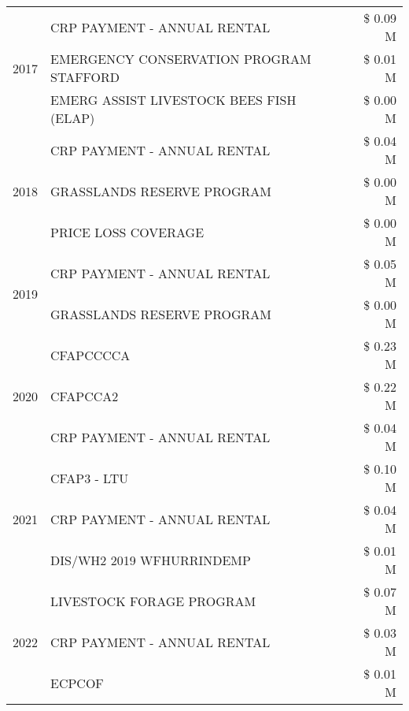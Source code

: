 \begin{tabular}{llr}
\cline{1-3}
\multirow[t]{3}{*}{2017} & CRP PAYMENT - ANNUAL RENTAL & \$ 0.09 M \\
 & EMERGENCY CONSERVATION PROGRAM STAFFORD & \$ 0.01 M \\
 & EMERG ASSIST LIVESTOCK BEES FISH (ELAP) & \$ 0.00 M \\
\cline{1-3}
\multirow[t]{3}{*}{2018} & CRP PAYMENT - ANNUAL RENTAL & \$ 0.04 M \\
 & GRASSLANDS RESERVE PROGRAM & \$ 0.00 M \\
 & PRICE LOSS COVERAGE & \$ 0.00 M \\
\cline{1-3}
\multirow[t]{2}{*}{2019} & CRP PAYMENT - ANNUAL RENTAL & \$ 0.05 M \\
 & GRASSLANDS RESERVE PROGRAM & \$ 0.00 M \\
\cline{1-3}
\multirow[t]{3}{*}{2020} & CFAPCCCCA & \$ 0.23 M \\
 & CFAPCCA2 & \$ 0.22 M \\
 & CRP PAYMENT - ANNUAL RENTAL & \$ 0.04 M \\
\cline{1-3}
\multirow[t]{3}{*}{2021} & CFAP3 - LTU & \$ 0.10 M \\
 & CRP PAYMENT - ANNUAL RENTAL & \$ 0.04 M \\
 & DIS/WH2 2019 WFHURRINDEMP & \$ 0.01 M \\
\cline{1-3}
\multirow[t]{3}{*}{2022} & LIVESTOCK FORAGE PROGRAM & \$ 0.07 M \\
 & CRP PAYMENT - ANNUAL RENTAL & \$ 0.03 M \\
 & ECPCOF & \$ 0.01 M \\
\cline{1-3}
\bottomrule
\end{tabular}
